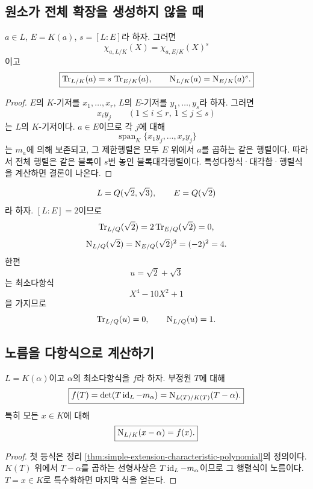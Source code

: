 \subsection{원소가 전체 확장을 생성하지 않을 때}

\begin{proposition}
\label{prop:norm-trace-generated-subfield}
$a\in L$, $E=K(a)$, $s=[L:E]$라 하자. 그러면
\[
  \boxed{
  \chi_{a,L/K}(X)
  =\chi_{a,E/K}(X)^s}
\]
이고
\[
  \boxed{
  \operatorname{Tr}_{L/K}(a)
  =s\,\operatorname{Tr}_{E/K}(a),
  \qquad
  \operatorname{N}_{L/K}(a)
  =\operatorname{N}_{E/K}(a)^s.}
\]
\end{proposition}

\begin{proof}
$E$의 $K$-기저를 $x_1,\dots,x_r$, $L$의 $E$-기저를
$y_1,\dots,y_s$라 하자. 그러면
\[
  x_i y_j\qquad(1\le i\le r,\ 1\le j\le s)
\]
는 $L$의 $K$-기저이다. $a\in E$이므로 각 $j$에 대해
\[
  \operatorname{span}_K\{x_1y_j,\dots,x_ry_j\}
\]
는 $m_a$에 의해 보존되고, 그 제한행렬은 모두
$E$ 위에서 $a$를 곱하는 같은 행렬이다. 따라서 전체 행렬은 같은 블록이 $s$번 놓인 블록대각행렬이다. 특성다항식·대각합·행렬식을 계산하면 결론이 나온다.
\end{proof}

\begin{example}[이중 이차확장]
\[
  L=Q(\sqrt2,\sqrt3),\qquad
  E=Q(\sqrt2)
\]
라 하자. $[L:E]=2$이므로
\[
  \operatorname{Tr}_{L/Q}(\sqrt2)
  =2\operatorname{Tr}_{E/Q}(\sqrt2)=0,
\]
\[
  \operatorname{N}_{L/Q}(\sqrt2)
  =\operatorname{N}_{E/Q}(\sqrt2)^2=(-2)^2=4.
\]
한편
\[
  u=\sqrt2+\sqrt3
\]
는 최소다항식
\[
  X^4-10X^2+1
\]
을 가지므로
\[
  \operatorname{Tr}_{L/Q}(u)=0,
  \qquad
  \operatorname{N}_{L/Q}(u)=1.
\]
\end{example}

\subsection{노름을 다항식으로 계산하기}

\begin{theorem}[최소다항식의 노름 표현]
\label{thm:minimal-polynomial-as-norm}
$L=K(\alpha)$이고 $\alpha$의 최소다항식을 $f$라 하자. 부정원 $T$에 대해
\[
  \boxed{
  f(T)=\det(T\operatorname{id}_L-m_\alpha)
  =\operatorname{N}_{L(T)/K(T)}(T-\alpha).}
\]
특히 모든 $x\in K$에 대해
\[
  \boxed{\operatorname{N}_{L/K}(x-\alpha)=f(x).}
\]
\end{theorem}

\begin{proof}
첫 등식은 정리 \ref{thm:simple-extension-characteristic-polynomial}의 정의이다.
$K(T)$ 위에서 $T-\alpha$를 곱하는 선형사상은
$T\operatorname{id}_L-m_\alpha$이므로 그 행렬식이 노름이다. $T=x\in K$로 특수화하면 마지막 식을 얻는다.
\end{proof}

